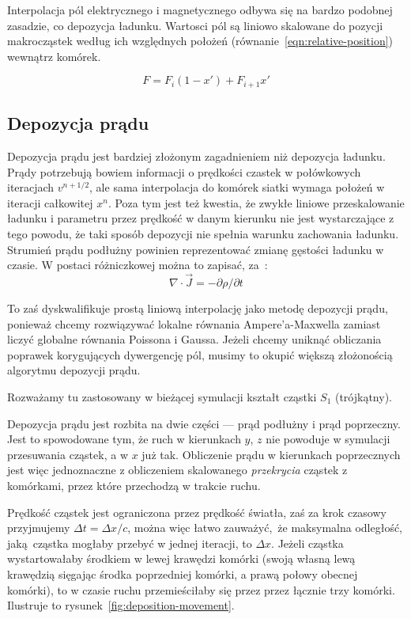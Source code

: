 Interpolacja pól elektrycznego i magnetycznego odbywa się na bardzo podobnej
zasadzie, co depozycja ładunku. Wartosci pól są liniowo skalowane do pozycji
makrocząstek według ich względnych położeń (równanie~\ref{eqn:relative-position}) wewnątrz komórek.

\begin{equation}
    F = F_i (1-x') + F_{i+1} x'
    \label{eqn:field-interpolation}
\end{equation}

\subsection{Depozycja prądu}

Depozycja prądu jest bardziej złożonym zagadnieniem niż depozycja ładunku.
Prądy potrzebują bowiem informacji o prędkości czastek w połówkowych
iteracjach $v^{n+1/2}$, ale sama interpolacja do komórek siatki wymaga
położeń w iteracji całkowitej $x^{n}$. Poza tym jest też kwestia, że zwykłe
liniowe przeskalowanie ładunku i parametru  przez prędkość w
danym kierunku nie jest wystarczające z tego powodu, że taki sposób
depozycji nie spełnia warunku zachowania ładunku. Strumień prądu podłużny
powinien reprezentować zmianę gęstości ładunku w czasie. W postaci różniczkowej
można to zapisać, za~\cite{bunemanvillasenor}:
\begin{equation}
\nabla \cdot \vec{J} = -\partial \rho / \partial t
\label{eqn:charge-conservation-condition}
\end{equation}

To zaś dyskwalifikuje prostą liniową interpolację jako metodę depozycji
prądu, ponieważ chcemy rozwiązywać lokalne równania Ampere'a-Maxwella
zamiast liczyć globalne równania Poissona i Gaussa.
Jeżeli chcemy uniknąć obliczania poprawek korygujących dywergencję pól,
musimy to okupić większą złożonością algorytmu depozycji prądu.

Rozważamy tu zastosowany w bieżącej symulacji kształt cząstki $S_1$ (trójkątny).

Depozycja prądu jest rozbita na dwie części --- prąd podłużny i prąd
poprzeczny. Jest to spowodowane tym, że ruch w kierunkach $y$, $z$ nie
powoduje w symulacji przesuwania cząstek, a w $x$ już tak. Obliczenie prądu
w kierunkach poprzecznych jest więc jednoznaczne z obliczeniem skalowanego
\emph{przekrycia} cząstek z komórkami, przez które przechodzą w trakcie
ruchu.

Prędkość cząstek jest ograniczona przez prędkość światła, zaś za krok czasowy
przyjmujemy $\Delta t = \Delta x/c$, można więc łatwo zauważyć, że maksymalna
odległość, jaką cząstka mogłaby przebyć w jednej iteracji, to $\Delta x$.
Jeżeli cząstka wystartowałaby środkiem w lewej krawędzi komórki (swoją
własną lewą krawędzią sięgając środka poprzedniej komórki, a prawą połowy
obecnej komórki), to w czasie ruchu przemieściłaby się przez
przez łącznie trzy komórki. Ilustruje to rysunek~\ref{fig:deposition-movement}.

